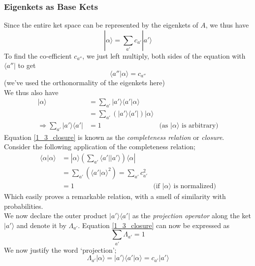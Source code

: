 \documentclass[12pt]{article}
\def\bra#1{\langle#1|}
\def\ket#1{|#1 \rangle}
\def\inpr#1#2{\langle #1|#2 \rangle}
\begin{document}
			\subsubsection{Eigenkets as Base Kets}
				Since the entire ket space can be represented by the eigenkets of $A$, we thus have
				\begin{equation}
					\ket \alpha = \sum_{a'} c_{a'}\ket{a'}
				\end{equation}
				To find the co-efficient $c_{a''}$, we just left multiply, both sides of the equation with $\bra {a''}$ to get
				\begin{equation}
					\inpr {a''}{\alpha} = c_{a''}
				\end{equation}
				(we've used the orthonormality of the eigenkets here)\\
				We thus also have
				\begin{align}
					\ket \alpha &= \sum_{a'} \ket {a'} \inpr {a'}{\alpha} \\
								&= \sum_{a'} (\ket {a'} \bra {a'}) \ket{\alpha} \\					
					\Rightarrow \sum_{a'} {\ket {a'} \bra{a'}} &= 1 &\text{(as $\ket \alpha$ is arbitrary)} \label{1_3_closure}
				\end{align}
				Equation \ref{1_3_closure} is known as the \emph{completeness relation} or \emph{closure}.\\
				Consider the following application of the completeness relation;
				\begin{align}
					\inpr \alpha \alpha &= \ket \alpha \left( \sum_{a'} \bra {a'} \ket {a'} \right) \bra \alpha \\
					 					&= \sum_{a'} (\inpr{a'}{\alpha}^2) = \sum_{a'} c_{a'}^2\\
					 					&= 1 								&\text{(if $\ket \alpha$ is normalized)}
				\end{align}
				Which easily proves a remarkable relation, with a smell of similarity with probabilities.\\
				We now declare the outer product $\ket {a'} \bra {a'}$ as the \emph{projection operator} along the ket $\ket {a'}$ and denote it by $\Lambda_{a'}$. Equation \ref{1_3_closure} can now be expressed as
				\begin{equation}
					\sum_{a'} \Lambda_{a'} = 1
				\end{equation}
				We now justify the word `projection';
				\begin{equation}
					\Lambda_{a'} \ket \alpha = \ket {a'} \inpr{a'}{\alpha} = c_{a'}\ket {a'}
				\end{equation}
\end{document}
